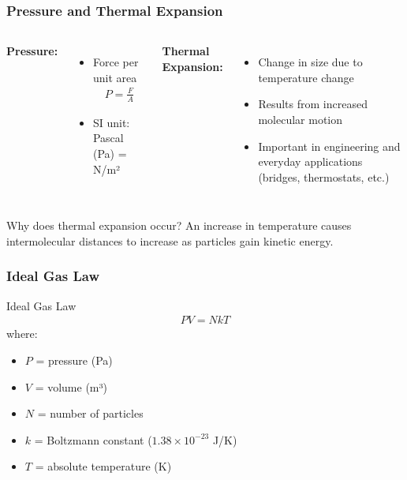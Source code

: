 \documentclass{beamer}
\begin{document}
\begin{frame}
    \frametitle{Pressure and Thermal Expansion}
    \begin{columns}
        \textbf{Pressure:}
        \begin{itemize}
            \item Force per unit area
            \begin{align*}
                P = \frac{F}{A}
            \end{align*}
            \item SI unit: Pascal (Pa) = N/m²
        \end{itemize}
        
        \textbf{Thermal Expansion:}
        \begin{itemize}
            \item Change in size due to temperature change
            \item Results from increased molecular motion
            \item Important in engineering and everyday applications (bridges, thermostats, etc.)
        \end{itemize}
    \end{columns}
    
    \begin{block}{Why does thermal expansion occur?}
        An increase in temperature causes intermolecular distances to increase as particles gain kinetic energy.
    \end{block}
\end{frame}

\begin{frame}
    \frametitle{Ideal Gas Law}
    \begin{alertblock}{Ideal Gas Law}
        \begin{align*}
            PV = NkT
        \end{align*}
        where:
        \begin{itemize}
            \item $P$ = pressure (Pa)
            \item $V$ = volume (m³)
            \item $N$ = number of particles
            \item $k$ = Boltzmann constant ($1.38 \times 10^{-23}$ J/K)
            \item $T$ = absolute temperature (K)
        \end{itemize}
    \end{alertblock}
    \end{frame}
\end{document}
